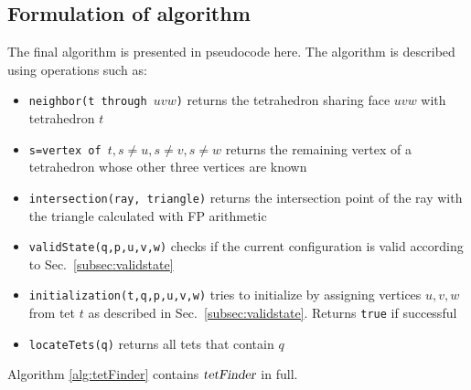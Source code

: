 \documentclass[../thesis.tex]{subfiles}
\begin{document}
\subsection{Formulation of algorithm}\label{subsec:tetfinder}
The final algorithm is presented in pseudocode here. The algorithm is described using operations such as:
\begin{itemize}
  \item \texttt{neighbor(t through $uvw$)} returns the tetrahedron sharing face $uvw$ with tetrahedron $t$
  \item \texttt{s=vertex of $t, s \neq u, s \neq v, s \neq w$} returns the remaining vertex of a tetrahedron whose other three
  vertices are known
  \item \texttt{intersection(ray, triangle)} returns the intersection point of the ray with the triangle calculated with FP arithmetic
  \item \texttt{validState(q,p,u,v,w)} checks if the current configuration is valid according to Sec.~\ref{subsec:validstate}
  \item \texttt{initialization(t,q,p,u,v,w)} tries to initialize by assigning vertices $u,v,w$ from tet $t$ as described in Sec.~\ref{subsec:validstate}. Returns \texttt{true} if successful
  \item \texttt{locateTets(q)} returns all tets that contain $q$
\end{itemize}
Algorithm \ref{alg:tetFinder} contains $\textsl{tetFinder}$ in full.
\end{document}
